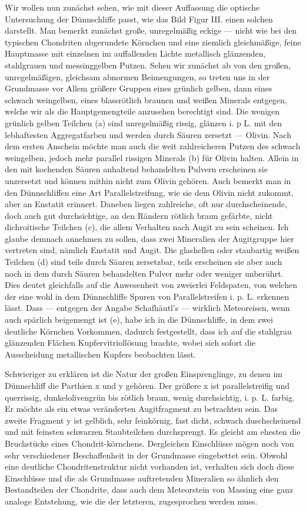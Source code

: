 \documentclass[a4paper, 11pt, oneside]{article}
\begin{document}
Wir wollen nun zunächst sehen, wie mit dieser Auffassung die optische Untersuchung der Dünnschliffe passt, wie das Bild Figur III. einen solchen darstellt. Man bemerkt zunächst große, unregelmäßig eckige — nicht wie bei den typischen Chondriten abgerundete Körnchen und eine ziemlich gleichmäßige, feine Hauptmasse mit einzelnen im auffallenden Lichte metallisch glänzenden, stahlgrauen und messinggelben Putzen. Sehen wir zunächst ab von den großen, unregelmäßigen, gleichsam abnormen Beimengungen, so treten uns in der Grundmasse vor Allem größere Gruppen eines grünlich gelben, dann eines schwach weingelben, eines blassrötlich braunen und weißen Minerals entgegen, welche wir als die Hauptgemengteile anzusehen berechtigt sind. Die wenigen grünlich gelben Teilchen (a) sind unregelmäßig rissig, glänzen i. p L. mit den lebhaftesten Aggregatfarben und werden durch Säuren zersetzt — Olivin. Nach dem ersten Anschein möchte man auch die weit zahlreicheren Putzen des schwach weingelben, jedoch mehr parallel rissigen Minerals (b) für Olivin halten. Allein in den mit kochenden Säuren anhaltend behandelten Pulvern erscheinen sie unzersetzt und können mithin nicht zum Olivin gehören. Auch bemerkt man in den Dünnschliffen eine Art Parallelstreifung, wie sie dem Olivin nicht zukommt, aber an Enstatit erinnert. Daneben liegen zahlreiche, oft nur durchscheinende, doch auch gut durchsichtige, an den Rändern rötlich braun gefärbte, nicht dichroitische Teilchen (c), die allem Verhalten nach Augit zu sein scheinen. Ich glaube demnach annehmen zu sollen, dass zwei Mineralien der Augitgruppe hier vertreten sind, nämlich Enstatit und Augit. Die glashellen oder staubartig weißen Teilchen (d) sind teils durch Säuren zersetzbar, teils erscheinen sie aber auch noch in dem durch Säuren behandelten Pulver mehr oder weniger unberührt. Dies deutet gleichfalls auf die Anwesenheit von zweierlei Feldspaten, von welchen der eine wohl in dem Dünnschliffe Spuren von Parallelstreifen i. p. L. erkennen lässt. Dass — entgegen der Angabe Schafhäutl's — wirklich Meteoreisen, wenn auch spärlich beigemengt ist (e), habe ich in die Dünnschliffe, in dem zwei deutliche Körnchen Vorkommen, dadurch festgestellt, dass ich auf die stahlgrau glänzenden Flächen Kupfervitriollösung brachte, wobei sich sofort die Ausscheidung metallischen Kupfers beobachten lässt.

Schwieriger zu erklären ist die Natur der großen Einsprenglinge, zu denen im Dünnschliff die Parthien x und y gehören. Der größere x ist parallelstreifig und querrissig, dunkelolivengrün bis rötlich braun, wenig durchsichtig, i. p. L. farbig. Er möchte als ein etwas veränderten Augitfragment zu betrachten sein. Das zweite Fragment y ist gelblich, sehr feinkörnig, fast dicht, schwach duschscheinend und mit feinsten schwarzen Staubteilchen durchsprengt. Es gleicht am ehesten die Bruchstücke eines Chondrit-körnchens. Dergleichen Einschlüsse mögen noch von sehr verschiedener Beschaffenheit in der Grundmasse eingebettet sein. Obwohl eine deutliche Chondritenstruktur nicht vorhanden ist, verhalten sich doch diese Einschlüsse und die als Grundmasse auftretenden Mineralien so ähnlich den Bestandteilen der Chondrite, dass auch dem Meteorstein von Massing eine ganz analoge Entstehung, wie die der letzteren, zugesprochen werden muss.
\end{document}
